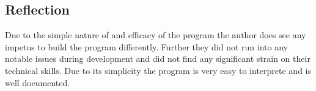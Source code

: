 \documentclass[11pt]{article}
\begin{document}
\subsection{Reflection}
Due to the simple nature of and efficacy of the program the author does see any impetus to build the program differently. Further they did not run into any notable issues during development and did not find any significant strain on their technical skills. Due to its simplicity the program is very easy to interprete and is well documented.


\end{document}
